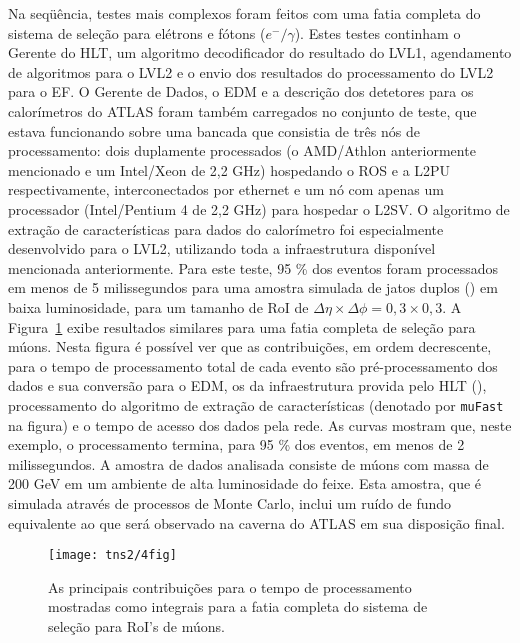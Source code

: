 Na seqüência, testes mais complexos foram feitos com uma fatia completa do
sistema de seleção para elétrons e fótons ($e^-/\gamma$). Estes testes
continham o Gerente do HLT, um algoritmo decodificador do resultado do LVL1,
agendamento de algoritmos para o LVL2 e o envio dos resultados do
processamento do LVL2 para o EF. O Gerente de Dados, o EDM e a descrição dos
detetores para os calorímetros do ATLAS foram também carregados no conjunto de
teste, que estava funcionando sobre uma bancada que consistia de três nós de
processamento: dois duplamente processados (o AMD/Athlon anteriormente
mencionado e um Intel/Xeon de 2,2 GHz) hospedando o ROS e a L2PU
respectivamente, interconectados por
 ethernet e um nó com apenas um processador (Intel/Pentium 4 de
2,2 GHz) para hospedar o L2SV. O algoritmo de extração de características para
dados do calorímetro foi especialmente desenvolvido para o LVL2, utilizando
toda a infraestrutura disponível mencionada anteriormente. Para este teste, 95
\% dos eventos foram processados em menos de 5 milissegundos para uma amostra
simulada de jatos duplos () em baixa luminosidade, para um
tamanho de RoI de $\Delta\eta \times \Delta\phi = 0,3 \times 0,3$. A
Figura~\ref{fig:l2sc-mu} exibe resultados similares para uma fatia completa de
seleção para múons. Nesta figura é possível ver que as contribuições, em ordem
decrescente, para o tempo de processamento total de cada evento são
pré-processamento dos dados e sua conversão para o EDM, os  da
infraestrutura provida pelo HLT (), processamento do algoritmo
de extração de características (denotado por \texttt{muFast} na figura) e o
tempo de acesso dos dados pela rede. As curvas mostram que, neste exemplo, o
processamento termina, para 95 \% dos eventos, em menos de 2 milissegundos. A
amostra de dados analisada consiste de múons com massa de 200 GeV em um
ambiente de alta luminosidade do feixe. Esta amostra, que é simulada através
de processos de Monte Carlo, inclui um ruído de fundo equivalente ao que será
observado na caverna do ATLAS em sua disposição final.

\begin{figure}
\begin{center}
\texttt{[image: tns2/4fig]}
\end{center}
\caption{As principais contribuições para o tempo de processamento mostradas
como integrais para a fatia completa do sistema de seleção para RoI's de
múons.}
\label{fig:l2sc-mu}
\end{figure}

